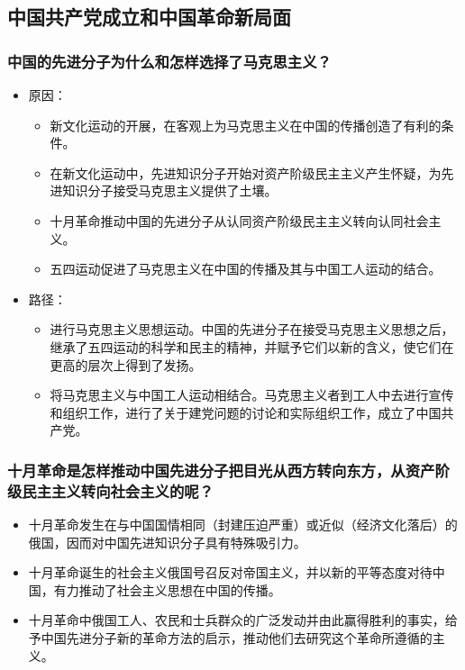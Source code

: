 \documentclass{article}
\begin{document}
\subsection{中国共产党成立和中国革命新局面}

\subsubsection{中国的先进分子为什么和怎样选择了马克思主义？}
\begin{itemize}
    \item 原因：
    \begin{itemize}
        \item 新文化运动的开展，在客观上为马克思主义在中国的传播创造了有利的条件。
        \item 在新文化运动中，先进知识分子开始对资产阶级民主主义产生怀疑，为先进知识分子接受马克思主义提供了土壤。
        \item 十月革命推动中国的先进分子从认同资产阶级民主主义转向认同社会主义。
        \item 五四运动促进了马克思主义在中国的传播及其与中国工人运动的结合。
    \end{itemize}
    \item 路径：
    \begin{itemize}
        \item 进行马克思主义思想运动。中国的先进分子在接受马克思主义思想之后，继承了五四运动的科学和民主的精神，并赋予它们以新的含义，使它们在更高的层次上得到了发扬。
        \item 将马克思主义与中国工人运动相结合。马克思主义者到工人中去进行宣传和组织工作，进行了关于建党问题的讨论和实际组织工作，成立了中国共产党。
    \end{itemize}
\end{itemize}

\subsubsection{十月革命是怎样推动中国先进分子把目光从西方转向东方，从资产阶级民主主义转向社会主义的呢？}
\begin{itemize}
    \item 十月革命发生在与中国国情相同（封建压迫严重）或近似（经济文化落后）的俄国，因而对中国先进知识分子具有特殊吸引力。
    \item 十月革命诞生的社会主义俄国号召反对帝国主义，并以新的平等态度对待中国，有力推动了社会主义思想在中国的传播。
    \item 十月革命中俄国工人、农民和士兵群众的广泛发动并由此赢得胜利的事实，给予中国先进分子新的革命方法的启示，推动他们去研究这个革命所遵循的主义。
\end{itemize}
\end{document}
